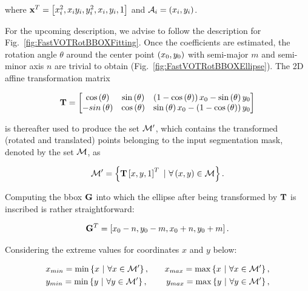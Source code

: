 \noindent where $\mathbf{x}^T = \left[ {{x}_{i}^{2}, x_i y_i, {y}_{i}^{2}, x_i, y_i, 1} \right]$ and $\mathcal{A}_i = \left( {x_i, y_i} \right)$.

For the upcoming description, we advise to follow the description for Fig.~\ref{fig:FastVOTRotBBOXFitting}. Once the coefficients are estimated, the rotation angle $\theta$ around the center point $\left( {x_0, y_0} \right)$ with semi-major $m$ and semi-minor axis $n$ are trivial to obtain (Fig.~\ref{fig:FastVOTRotBBOXEllipse}). The 2D affine transformation matrix

\begin{equation}
    \mathbf{T} =
    \begin{bmatrix}
        {\cos} \left( \theta \right) &
        {\sin} \left( \theta \right) &
        \left( {1 - {\cos} \left( \theta \right)} \right)x_0 - {\sin} \left( \theta \right) y_0\\
        -{sin} \left( \theta \right) &
        {\cos} \left( \theta \right) &
        {\sin} \left( \theta \right) x_0 - \left( {1 - {\cos} \left( \theta \right)} \right) y_0
    \end{bmatrix}
\end{equation}

\noindent is thereafter used to produce the set $\mathcal{M'}$, which contains the transformed (rotated and translated) points belonging to the input segmentation mask, denoted by the set $\mathcal{M}$, as

\begin{equation}
    \mathcal{M'} =
    \left\{ {
        \mathbf{T}
        \left[ {x, y, 1} \right]^T
        \ | \
        \forall \left( {x, y} \right) \in \mathcal{M}
    } \right\}.
\end{equation}

\noindent Computing the \gls{bbox} $\mathbf{G}$ into which the ellipse after being transformed by $\mathbf{T}$ is inscribed is rather straightforward:

\begin{equation}
    {\mathbf{G}}^T = \left[ {x_0 - n, y_0 - m, x_0 + n, y_0 + m} \right].
\end{equation}

\noindent Considering the extreme values for coordinates $x$ and $y$ below:

\begin{equation}
    \begin{aligned}
        &x_{min} = \min \left\{ {x\ |\ \forall x \in \mathcal{M'}} \right\},
        \quad
        &x_{max} = \max \left\{ {x\ |\ \forall x \in \mathcal{M'}} \right\},\\
        &y_{min} = \min \left\{ {y\ |\ \forall y \in \mathcal{M'}} \right\},
        \quad
        &y_{max} = \max \left\{ {y\ |\ \forall y \in \mathcal{M'}} \right\},
    \end{aligned}
\end{equation}

